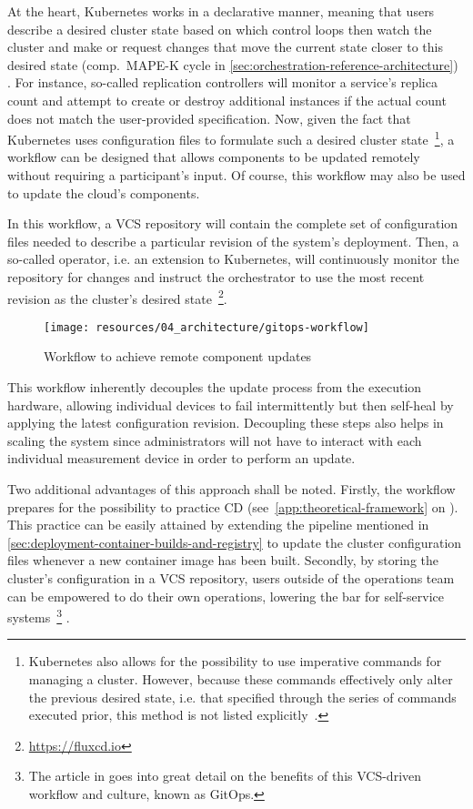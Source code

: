 At the heart, Kubernetes works in a declarative manner, meaning that users describe a desired cluster state based on which control loops then watch the cluster and make or request changes that move the current state closer to this desired state (comp.~\acs{MAPE-K} cycle in \autoref{sec:orchestration-reference-architecture}) \cite{kubernetesControllers}. For instance, so-called replication controllers will monitor a service's replica count and attempt to create or destroy additional instances if the actual count does not match the user-provided specification. Now, given the fact that Kubernetes uses configuration files to formulate such a desired cluster state~\footnote{Kubernetes also allows for the possibility to use imperative commands for managing a cluster. However, because these commands effectively only alter the previous desired state, i.e. that specified through the series of commands executed prior, this method is not listed explicitly~\cite{kubernetesImperative}.}, a workflow can be designed that allows components to be updated remotely without requiring a participant's input. Of course, this workflow may also be used to update the cloud's components.

In this workflow, a \acs{VCS} repository will contain the complete set of configuration files needed to describe a particular revision of the system's deployment. Then, a so-called operator, i.e. an extension to Kubernetes, will continuously monitor the repository for changes and instruct the orchestrator to use the most recent revision as the cluster's desired state~\footnote{\url{https://fluxcd.io}}.

\begin{figure}[hbt]
  \centering
  \texttt{[image: resources/04\_architecture/gitops-workflow]}
  \caption{Workflow to achieve remote component updates}
  \label{fig:gitops-workflow}
\end{figure}

\FloatBarrier

This workflow inherently decouples the update process from the execution hardware, allowing individual devices to fail intermittently but then self-heal by applying the latest configuration revision. Decoupling these steps also helps in scaling the system since administrators will not have to interact with each individual measurement device in order to perform an update.

Two additional advantages of this approach shall be noted. Firstly, the workflow prepares for the possibility to practice \acl{CD} (see~\autoref{app:theoretical-framework} on ). This practice can be easily attained by extending the pipeline mentioned in \autoref{sec:deployment-container-builds-and-registry} to update the cluster configuration files whenever a new container image has been built. Secondly, by storing the cluster's configuration in a \acs{VCS} repository, users outside of the operations team can be empowered to do their own operations, lowering the bar for self-service systems~\footnote{The article in \cite{limoncelli2018gitops} goes into great detail on the benefits of this \acs{VCS}-driven workflow and culture, known as GitOps.} \cite[p.~38]{limoncelli2018gitops}.

